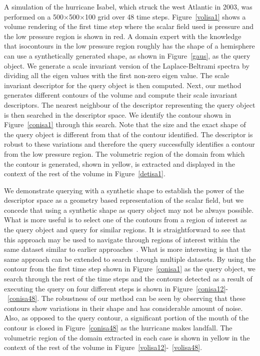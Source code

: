 \documentclass[review,journal]{vgtc}         %
\begin{document}
A simulation of the hurricane Isabel, which struck the west Atlantic in 2003, was performed
on a 500$\times$500$\times$100 grid over 48 time steps. Figure~\ref{volisa1} shows a volume rendering
of the first time step where the scalar field used is pressure and the low pressure region
is shown in red. A domain expert with the knowledge that isocontours in the low pressure region
roughly has the shape of a hemisphere can use a synthetically generated shape, as shown in 
Figure~\ref{gaus}, as the query object. We generate a scale invariant version of the Laplace-Beltrami
spectra by dividing all the eigen values with the first non-zero eigen value. The scale invariant
descriptor for the query object is then computed. Next, our method generates different contours of the 
volume and compute their scale invariant descriptors. The nearest neighbour of the descriptor 
representing the query object is then searched in the descriptor space. We identify the contour
shown in Figure~\ref{conisa1} through this search. Note that the size and the exact shape of the
query object is different from that of the contour identified.
The descriptor is robust to these variations and therefore the query successfully identifies 
a contour from the low pressure region. The volumetric region of the domain from which the contour
is generated, shown in yellow, is extracted and displayed in the context of the rest of the volume in 
Figure~\ref{detisa1}. 

We demonstrate querying with
a synthetic shape to establish the power of the descriptor space as a geometry based representation 
of the scalar field, but we concede that using a synthetic shape as query object may not be always 
possible. What is more useful is to select one of the contours from a region of interest as the query
object and query for similar regions. It is straightforward to see that this approach may be used
to navigate through regions of interest within the same dataset similar to earlier approaches~\cite{ThomN13,MasoodTN13}.
What is more interesting is that the same approach can be extended to search through multiple datasets.
By using the contour from the first time step shown in Figure~\ref{conisa1} as the query object, we search through 
the rest of the time steps and the contours detected as a result of executing the query on four different 
steps is shown in Figure~\ref{conisa12}-~\ref{conisa48}. The robustness of our method can be seen by observing
that these contours show variations in their shape and has considerable amount of noise. 
Also, as opposed to the query contour, a significant portion
of the mouth of the contour is closed in Figure~\ref{conisa48} as the hurricane makes landfall.
The volumetric region of the domain extracted in each case is shown in yellow in the context of the rest
of the volume in Figure~\ref{volisa12}-~\ref{volisa48}.
\end{document}
